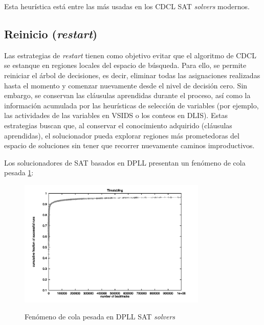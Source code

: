 
Esta heur\'istica est\'a entre las m\'as usadas en los CDCL SAT \textit{solvers} modernos.

\subsection{Reinicio (\textit{restart})}
\label{subsec:restart}

Las estrategias de \textit{restart} tienen como objetivo evitar que el algoritmo de CDCL se estanque en regiones locales del espacio de búsqueda. Para ello, se permite reiniciar el árbol de decisiones, es decir, eliminar todas las asignaciones realizadas hasta el momento y comenzar nuevamente desde el nivel de decisión cero. Sin embargo, se conservan las cláusulas aprendidas durante el proceso, así como la información acumulada por las heurísticas de selección de variables (por ejemplo, las actividades de las variables en VSIDS o los conteos en DLIS). Estas estrategias buscan que, al conservar el conocimiento adquirido (cláusulas aprendidas), el solucionador pueda explorar regiones más prometedoras del espacio de soluciones sin tener que recorrer nuevamente caminos improductivos.

Los solucionadores de SAT basados en DPLL presentan un fen\'omeno de cola pesada \cite{oliveras2009dpll_cdcl} \ref{fig:cola_pesada}:

\begin{figure}[ht]
    \centering
    \includegraphics[width=0.8\textwidth]{Graphics/cola_pesada.png}
    \caption{Fen\'omeno de cola pesada en DPLL SAT \textit{solvers}}
    \cite{oliveras2009dpll_cdcl}
    \label{fig:cola_pesada}
\end{figure}

